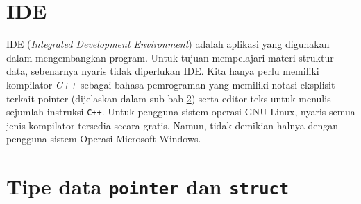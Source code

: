 \section{IDE}
IDE (\textit{Integrated Development Environment}) adalah aplikasi yang digunakan dalam mengembangkan program. Untuk tujuan mempelajari materi struktur data, sebenarnya nyaris tidak diperlukan IDE. Kita hanya perlu memiliki kompilator \textit{C++} sebagai bahasa pemrograman yang memiliki notasi eksplisit terkait pointer (dijelaskan dalam sub bab \ref{sec:pointer}) serta editor teks untuk menulis sejumlah instruksi \texttt{C++}. Untuk pengguna sistem operasi GNU Linux, nyaris semua jenis kompilator tersedia secara gratis. Namun, tidak demikian halnya dengan pengguna sistem Operasi Microsoft Windows.

\section{Tipe data \texttt{pointer} dan \texttt{struct}}
\label{sec:pointer}




